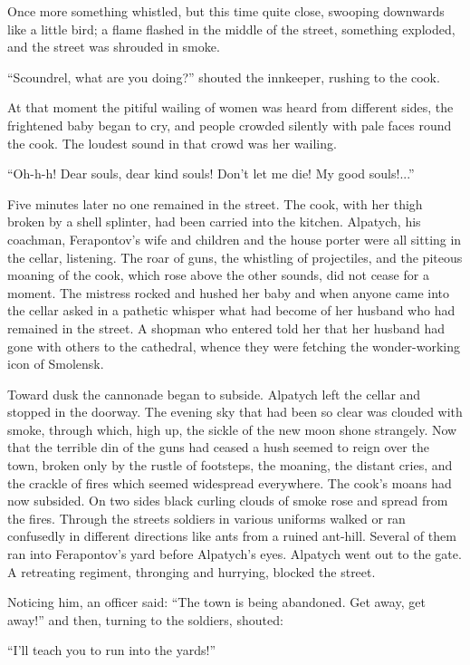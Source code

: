 Once more something whistled, but this time quite close, swooping
downwards like a little bird; a flame flashed in the middle of
the street, something exploded, and the street was shrouded in
smoke.

``Scoundrel, what are you doing?'' shouted the innkeeper, rushing
to the cook.

At that moment the pitiful wailing of women was heard from
different sides, the frightened baby began to cry, and people
crowded silently with pale faces round the cook. The loudest
sound in that crowd was her wailing.

``Oh-h-h! Dear souls, dear kind souls! Don't let me die! My good
souls!...''

Five minutes later no one remained in the street. The cook, with
her thigh broken by a shell splinter, had been carried into the
kitchen.  Alpatych, his coachman, Ferapontov's wife and children
and the house porter were all sitting in the cellar,
listening. The roar of guns, the whistling of projectiles, and
the piteous moaning of the cook, which rose above the other
sounds, did not cease for a moment. The mistress rocked and
hushed her baby and when anyone came into the cellar asked in a
pathetic whisper what had become of her husband who had remained
in the street. A shopman who entered told her that her husband
had gone with others to the cathedral, whence they were fetching
the wonder-working icon of Smolensk.

Toward dusk the cannonade began to subside. Alpatych left the
cellar and stopped in the doorway. The evening sky that had been
so clear was clouded with smoke, through which, high up, the
sickle of the new moon shone strangely. Now that the terrible din
of the guns had ceased a hush seemed to reign over the town,
broken only by the rustle of footsteps, the moaning, the distant
cries, and the crackle of fires which seemed widespread
everywhere. The cook's moans had now subsided. On two sides black
curling clouds of smoke rose and spread from the fires. Through
the streets soldiers in various uniforms walked or ran confusedly
in different directions like ants from a ruined ant-hill. Several
of them ran into Ferapontov's yard before Alpatych's
eyes. Alpatych went out to the gate. A retreating regiment,
thronging and hurrying, blocked the street.

Noticing him, an officer said: ``The town is being abandoned. Get
away, get away!'' and then, turning to the soldiers, shouted:

``I'll teach you to run into the yards!''

